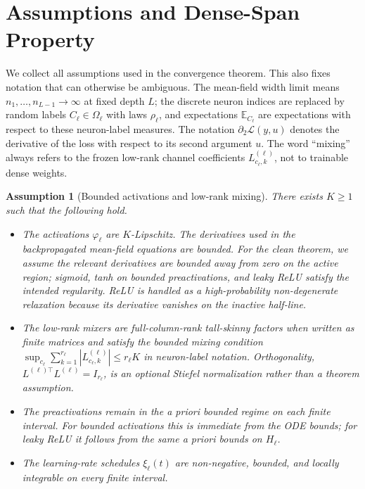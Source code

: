 \documentclass{article}
\newtheorem{assumption}[theorem]{Assumption}
\newcommand{\E}{\mathbb{E}}
\newcommand{\calL}{\mathcal{L}}
\begin{document}
\iffalse
\appendix

\section{Assumptions and Dense-Span Property}
\label{app:assumptions}

We collect all assumptions used in the convergence theorem. This also fixes notation that can otherwise be ambiguous. The mean-field width limit means $n_1,\ldots,n_{L-1}\to\infty$ at fixed depth $L$; the discrete neuron indices are replaced by random labels $C_\ell\in\Omega_\ell$ with laws $\rho_\ell$, and expectations $\E_{C_\ell}$ are expectations with respect to these neuron-label measures. The notation $\partial_2\calL(y,u)$ denotes the derivative of the loss with respect to its second argument $u$. The word ``mixing'' always refers to the frozen low-rank channel coefficients $L^{(\ell)}_{c_\ell,k}$, not to trainable dense weights.

\begin{assumption}[Bounded activations and low-rank mixing]
\label{assump:regularity}
There exists $K\ge1$ such that the following hold.
\begin{itemize}
\item The activations $\varphi_\ell$ are $K$-Lipschitz. The derivatives used in the backpropagated mean-field equations are bounded. For the clean theorem, we assume the relevant derivatives are bounded away from zero on the active region; sigmoid, tanh on bounded preactivations, and leaky ReLU satisfy the intended regularity. ReLU is handled as a high-probability non-degenerate relaxation because its derivative vanishes on the inactive half-line.
\item The low-rank mixers are full-column-rank tall-skinny factors when written as finite matrices and satisfy the bounded mixing condition $\sup_{c_\ell}\sum_{k=1}^{r_\ell}|L^{(\ell)}_{c_\ell,k}|\le r_\ell K$ in neuron-label notation. Orthogonality, $L^{(\ell)\top}L^{(\ell)}=I_{r_\ell}$, is an optional Stiefel normalization rather than a theorem assumption.
\item The preactivations remain in the a priori bounded regime on each finite interval. For bounded activations this is immediate from the ODE bounds; for leaky ReLU it follows from the same a priori bounds on $H_\ell$.
\item The learning-rate schedules $\xi_\ell(t)$ are non-negative, bounded, and locally integrable on every finite interval.
\end{itemize}
\end{assumption}
\end{document}
